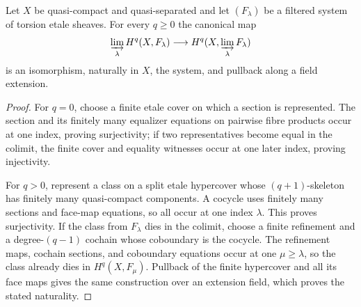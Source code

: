 \begin{lemma}
\label{lemma:weil-pbc-curve-filtered-cohomology}
\uses{}
Let $X$ be quasi-compact and quasi-separated and let $(F_\lambda)$ be a
filtered system of torsion etale sheaves.  For every $q\geq0$ the canonical
map
\[
 \varinjlim_\lambda H^q(X,F_\lambda)\longrightarrow
 H^q(X,\varinjlim_\lambda F_\lambda)
\]
is an isomorphism, naturally in $X$, the system, and pullback along a field
extension.
\end{lemma}
\begin{proof}
\uses{} 
For $q=0$, choose a finite etale cover on which a section is represented.
The section and its finitely many equalizer equations on pairwise fibre
products occur at one index, proving surjectivity; if two representatives
become equal in the colimit, the finite cover and equality witnesses occur
at one later index, proving injectivity.

For $q>0$, represent a class on a split etale hypercover whose
$(q+1)$-skeleton has finitely many quasi-compact components.  A cocycle uses
finitely many sections and face-map equations, so all occur at one index
$\lambda$.  This proves surjectivity.  If the class from $F_\lambda$ dies in
the colimit, choose a finite refinement and a degree-$(q-1)$ cochain whose
coboundary is the cocycle.  The refinement maps, cochain sections, and
coboundary equations occur at one $\mu\geq\lambda$, so the class already
dies in $H^q(X,F_\mu)$.  Pullback of the finite hypercover and all its face
maps gives the same construction over an extension field, which proves the
stated naturality.
\end{proof}

